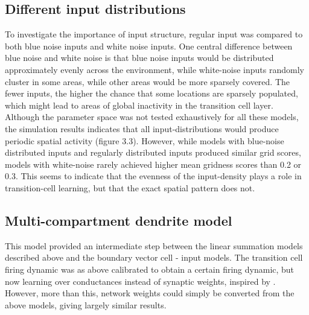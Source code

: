 \documentclass{article}
\begin{document}
    \subsection{Different input distributions}
    To investigate the importance of input structure, regular input was compared to both blue noise inputs and white noise inputs. One central difference between blue noise and white noise is that blue noise inputs would be distributed approximately evenly across the environment, while white-noise inputs randomly cluster in some areas, while other areas would be more sparsely covered. The fewer inputs, the higher the chance that some locations are sparsely populated, which might lead to areas of global inactivity in the transition cell layer.
    Although the parameter space was not tested exhaustively for all these models, the simulation results indicates that all input-distributions would produce periodic spatial activity (figure 3.3). However, while models with blue-noise distributed inputs and regularly distributed inputs produced similar grid scores, models with  white-noise rarely achieved higher mean gridness scores than 0.2 or 0.3. This seems to indicate that the evenness of the input-density plays a role in transition-cell learning, but that the exact spatial pattern does not.

    \subsection{Multi-compartment dendrite model}
    This model provided an intermediate step between the linear summation models described above and the boundary vector cell - input models. The transition cell firing dynamic was as above calibrated to obtain a certain firing dynamic, but now learning over conductances instead of synaptic weights, inspired by . However, more than this, network weights could simply be converted from the above models, giving largely similar results. 



    \printbibliography
\end{document}
